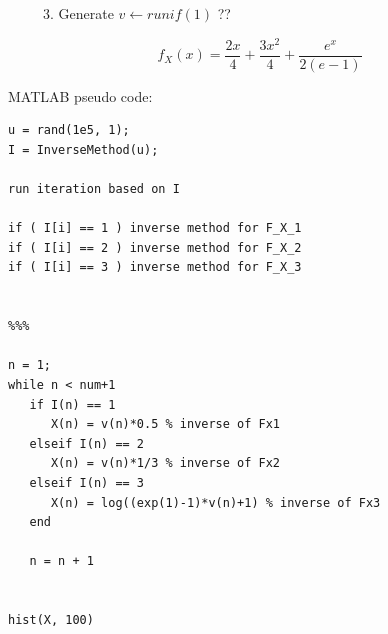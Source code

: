 \documentclass{report}
\begin{document}
\ \ \ \ \ 3. Generate $v \leftarrow runif(1)$ ??
 
$$f_X(x) = \frac{2x}{4} + \frac{3x^2}{4} + \frac{e^x}{2(e-1)}$$
  
MATLAB pseudo code:

\begin{verbatim}
u = rand(1e5, 1);
I = InverseMethod(u);

run iteration based on I

if ( I[i] == 1 ) inverse method for F_X_1
if ( I[i] == 2 ) inverse method for F_X_2
if ( I[i] == 3 ) inverse method for F_X_3


%%%

n = 1;
while n < num+1
   if I(n) == 1
      X(n) = v(n)*0.5 % inverse of Fx1
   elseif I(n) == 2
      X(n) = v(n)*1/3 % inverse of Fx2
   elseif I(n) == 3
      X(n) = log((exp(1)-1)*v(n)+1) % inverse of Fx3
   end
   
   n = n + 1
   
   
hist(X, 100)


\end{verbatim}

 
\end{document}
